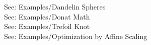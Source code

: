 \documentclass[a4paper,10pt]{article}
\begin{document}
\begin{eulernotebook}
\begin{eulercomment}
See: Examples/Dandelin Spheres\\
See: Examples/Donat Math\\
See: Examples/Trefoil Knot\\
See: Examples/Optimization by Affine Scaling
\end{eulercomment}
\end{eulernotebook}
\end{document}
